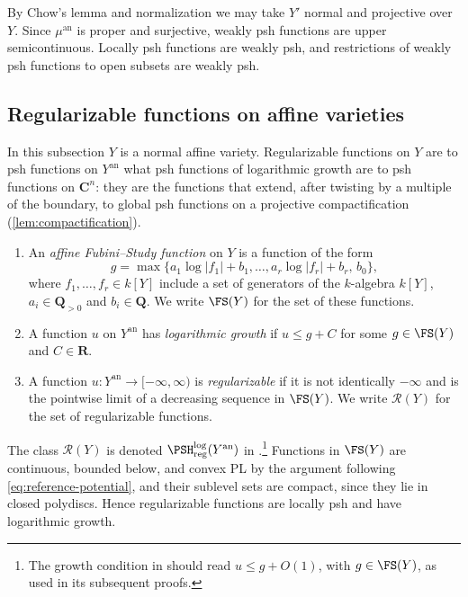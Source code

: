 \documentclass[11pt,a4paper]{article}
\newcommand{\an}{\mathrm{an}}          %
\begin{document}
By Chow's lemma and normalization we may take $Y'$ normal and projective over $Y$. Since $\mu^{\an}$ is proper and surjective, weakly psh functions are upper semicontinuous. Locally psh functions are weakly psh, and restrictions of weakly psh functions to open subsets are weakly psh.

\subsection{Regularizable functions on affine varieties}\label{subsec:affine-regularizable}

In this subsection $Y$ is a normal affine variety. Regularizable functions on $Y$ are to psh functions on $Y^{\an}$ what psh functions of logarithmic growth are to psh functions on $\mathbf C^n$: they are the functions that extend, after twisting by a multiple of the boundary, to global psh functions on a projective compactification (\cref{lem:compactification}).

\begin{definition}\label{def:regularizable}
\begin{enumerate}
\item An \emph{affine Fubini--Study function} on $Y$ is a function of the form
\[
g=\max\{a_1\log|f_1|+b_1,\ldots,a_r\log|f_r|+b_r,\,b_0\},
\]
where $f_1,\ldots,f_r\in k[Y]$ include a set of generators of the $k$-algebra $k[Y]$, $a_i\in\mathbf Q_{>0}$ and $b_i\in\mathbf Q$. We write $\FS(Y)$ for the set of these functions.
\item A function $u$ on $Y^{\an}$ has \emph{logarithmic growth} if $u\le g+C$ for some $g\in\FS(Y)$ and $C\in\mathbf R$.
\item A function $u\colon Y^{\an}\to[-\infty,\infty)$ is \emph{regularizable} if it is not identically $-\infty$ and is the pointwise limit of a decreasing sequence in $\FS(Y)$. We write $\mathcal{R}(Y)$ for the set of regularizable functions.
\end{enumerate}
\end{definition}

The class $\mathcal{R}(Y)$ is denoted $\PSH^{\log}_{\mathrm{reg}}(Y^{\an})$ in \cite[Definition~3.15]{Wu26}.\footnote{The growth condition in \cite[Definition~3.15(2)]{Wu26} should read $u\le g+O(1)$, with $g\in\FS(Y)$, as used in its subsequent proofs.} Functions in $\FS(Y)$ are continuous, bounded below, and convex PL by the argument following \eqref{eq:reference-potential}, and their sublevel sets are compact, since they lie in closed polydiscs. Hence regularizable functions are locally psh and have logarithmic growth.
\end{document}

